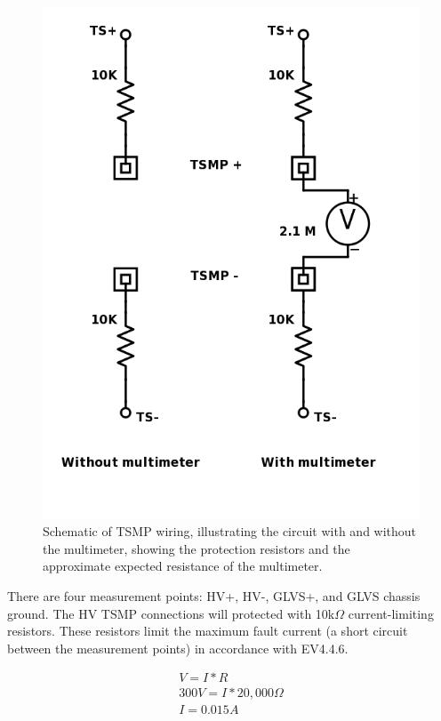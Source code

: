 \documentclass{article}
\begin{document}
\begin{figure}[H]
\centering
\includegraphics[scale=0.5]{TSMP-Schematic.png}
\caption{Schematic of TSMP wiring, illustrating the circuit with and without the multimeter, showing the protection resistors and the approximate expected resistance of the multimeter.}
\label{fig:TSMP_schematic}
\end{figure}

There are four measurement points: HV+, HV-, GLVS+, and GLVS chassis ground. The HV TSMP connections will protected with 10k$\Omega$ current-limiting resistors. These resistors limit the maximum fault current (a short circuit between the measurement points) in accordance with EV4.4.6. 

\begin{align*}
V = I * R \\
300V = I * 20,000\Omega \\
I = 0.015A
\end{align*}
\end{document}
